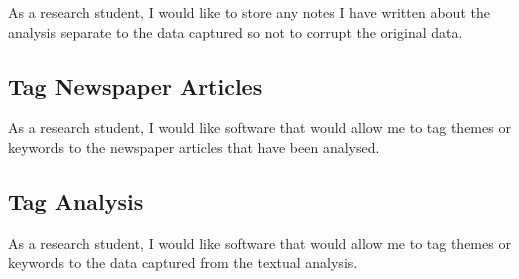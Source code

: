 \documentclass{article}
\begin{document}
As a research student, I would like to store any notes I have written about the analysis separate to the data captured so not to corrupt the original data.

\subsection*{Tag Newspaper Articles}

As a research student, I would like software that would allow me to tag themes or keywords to the newspaper articles that have been analysed.

\subsection*{Tag Analysis}

As a research student, I would like software that would allow me to tag themes or keywords to the data captured from the textual analysis.
\end{document}
